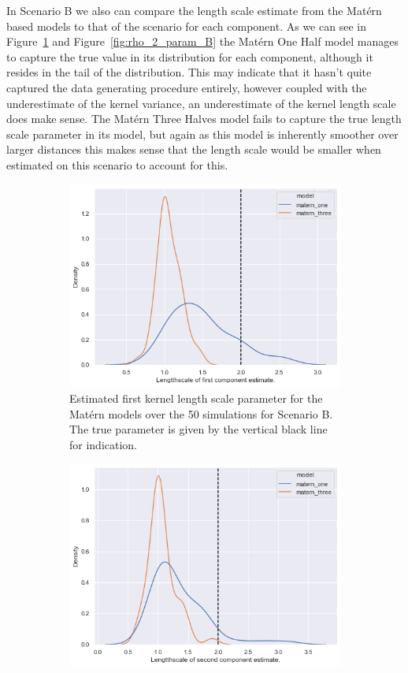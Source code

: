 In Scenario B we also can compare the length scale estimate from the Mat\'ern based models to that of the scenario for each component.
As we can see in Figure~\ref{fig:rho_1_param_B} and Figure~\ref{fig:rho_2_param_B} the Mat\'ern One Half model manages to capture the true value in its distribution for each component, although it resides in the tail of the distribution.
This may indicate that it hasn't quite captured the data generating procedure entirely, however coupled with the underestimate of the kernel variance, an underestimate of the kernel length scale does make sense.
The Mat\'ern Three Halves model fails to capture the true length scale parameter in its model, but again as this model is inherently smoother over larger distances this makes sense that the length scale would be smaller when estimated on this scenario to account for this.
\begin{figure}
	\centering
	\begin{subfigure}[b]{0.45\textwidth}
		\includegraphics[width=\textwidth]{rho_1_param_B}
		\caption{Estimated first kernel length scale parameter for the Mat\'ern models over the 50 simulations for Scenario B. The true parameter is given by the vertical black line for indication.}
		\label{fig:rho_1_param_B}
	\end{subfigure}
	\hfill
	\begin{subfigure}[b]{0.45\textwidth}
		\includegraphics[width=\textwidth]{rho_2_param_B}

\end{subfigure}
\end{figure}
